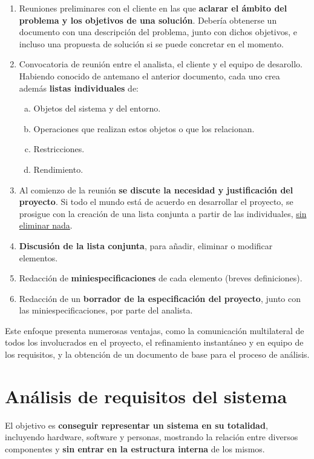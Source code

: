 \begin{enumerate}
    \item Reuniones preliminares con el cliente en las que \textbf{aclarar el ámbito del problema y los objetivos de una solución}. Debería obtenerse un documento con una descripción del problema, junto con dichos objetivos, e incluso una propuesta de solución si se puede concretar en el momento.
    \item Convocatoria de reunión entre el analista, el cliente y el equipo de desarollo. Habiendo conocido de antemano el anterior documento, cada uno crea además \textbf{listas individuales} de:
        \begin{enumerate}[a.]
            \item Objetos del sistema y del entorno.
            \item Operaciones que realizan estos objetos o que los relacionan.
            \item Restricciones.
            \item Rendimiento.
        \end{enumerate}
    \item Al comienzo de la reunión \textbf{se discute la necesidad y justificación del proyecto}. Si todo el mundo está de acuerdo en desarrollar el proyecto, se prosigue con la creación de una lista conjunta a partir de las individuales, \uline{sin eliminar nada}.
    \item \textbf{Discusión de la lista conjunta}, para añadir, eliminar o modificar elementos.
    \item Redacción de \textbf{miniespecificaciones} de cada elemento (breves definiciones).
    \item Redacción de un \textbf{borrador de la especificación del proyecto}, junto con las miniespecificaciones, por parte del analista.
\end{enumerate}

Este enfoque presenta numerosas ventajas, como la comunicación multilateral de todos los involucrados en el proyecto, el refinamiento instantáneo y en equipo de los requisitos, y la obtención de un documento de base para el proceso de análisis.


\section{Análisis de requisitos del sistema}

El objetivo es \textbf{conseguir representar un sistema en su totalidad}, incluyendo hardware, software y personas, mostrando la relación entre diversos componentes y \textbf{sin entrar en la estructura interna} de los mismos.\\

